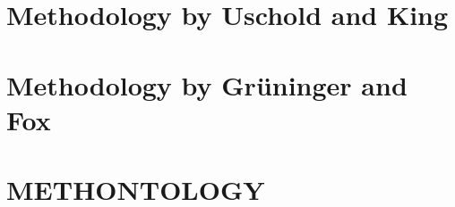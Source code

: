 \section{Methodology by Uschold and King}
\label{sec:approach3}

\section{Methodology by Grüninger and Fox}
\label{sec:approach4}

\section{METHONTOLOGY}
\label{sec:approach5}

\begin{comment}

The authors of the article introducing the approach named \methontology, Gómez-Pérez et al., perceived absence of a clear engineering approach towards building ontology from scratch \cite{Methontology}. Hence, Gómez-Pérez et al. described a process for developing ontologies and specified a life cycle for ontologies. Based upon that, they specified \methontology as a straight-forward engineering approach for building ontologies.

There are several papers describing how to apply \methontology on certain domains \cite{MethontologyLegal} \cite{MethontologyChemical}. While the overall approach is the same in all of these articles, there are slight differences in the details of each step. This section describes the steps used in chapter \ref{ch:thinkhomeweather_ontology}. Thus, it differs slightly from the steps described in \cite{Methontology}.

\subsection{Ontology development process and life cycle}

The ontology development process as used by Gómez-Pérez et al. divides ontology development into the following activities that need to be performed \cite{Methontology}:


\end{comment}
